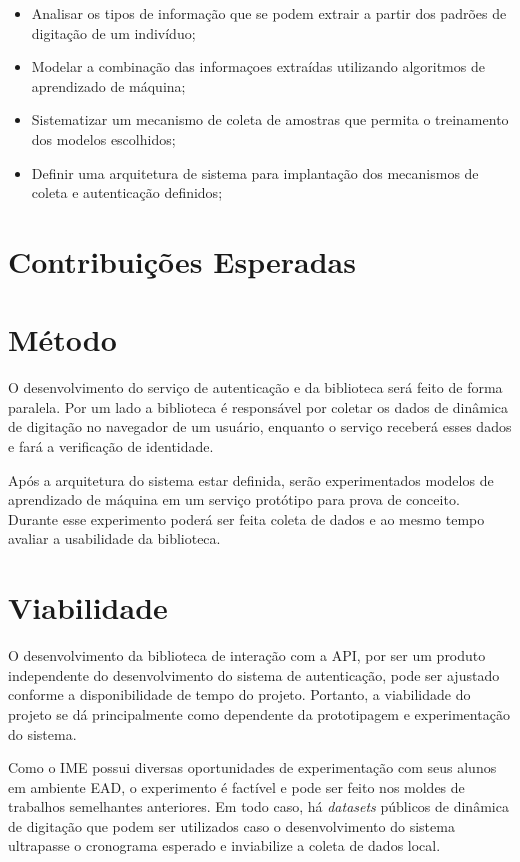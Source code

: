 \documentclass[pfc]{imetex}
\begin{document}
\begin{itemize}
\item Analisar os tipos de informação que se podem extrair a partir dos padrões de digitação de um indivíduo;
\item Modelar a combinação das informaçoes extraídas utilizando algoritmos de aprendizado de máquina;
\item Sistematizar um mecanismo de coleta de amostras que permita o treinamento dos modelos escolhidos;
\item Definir uma arquitetura de sistema para implantação dos mecanismos de coleta e autenticação definidos;
\end{itemize}

\section{Contribuições Esperadas}

\section{Método}
O desenvolvimento do serviço de autenticação e da biblioteca será feito de forma paralela. Por um lado a biblioteca é responsável por coletar os dados de dinâmica de digitação no navegador de um usuário, enquanto o serviço receberá esses dados e fará a verificação de identidade.

Após a arquitetura do sistema estar definida, serão experimentados modelos de aprendizado de máquina em um serviço protótipo para prova de conceito. Durante esse experimento poderá ser feita coleta de dados e ao mesmo tempo avaliar a usabilidade da biblioteca.

\section{Viabilidade}
O desenvolvimento da biblioteca de interação com a API, por ser um  produto independente do desenvolvimento do sistema de autenticação, pode ser ajustado conforme a disponibilidade de tempo do projeto. Portanto, a viabilidade do projeto se dá principalmente como dependente da prototipagem e experimentação do sistema.

Como o IME possui diversas oportunidades de experimentação com seus alunos em ambiente EAD, o experimento é factível e pode ser feito nos moldes de trabalhos semelhantes anteriores. Em todo caso, há \textit{datasets} públicos de dinâmica de digitação que podem ser utilizados caso o desenvolvimento do sistema ultrapasse o cronograma esperado e inviabilize a coleta de dados local.
\end{document}
